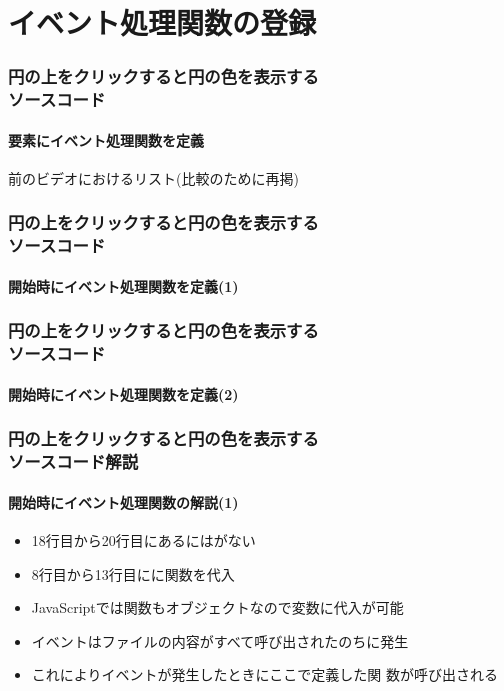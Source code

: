 \section{イベント処理関数の登録}
\begin{frame}[containsverbatim]
 \frametitle{円の上をクリックすると円の色を表示する\\ソースコード}
 \framesubtitle{要素にイベント処理関数を定義}
\centering 前のビデオにおけるリスト(比較のために再掲)
\end{frame}
\begin{frame}[containsverbatim]
 \frametitle{円の上をクリックすると円の色を表示する\\ソースコード}
  \framesubtitle{開始時にイベント処理関数を定義(1)}
\end{frame}
\begin{frame}[containsverbatim]
 \frametitle{円の上をクリックすると円の色を表示する\\ソースコード}
  \framesubtitle{開始時にイベント処理関数を定義(2)}
\end{frame}
\begin{frame}[containsverbatim]
 \frametitle{円の上をクリックすると円の色を表示する\\ソースコード解説}
  \framesubtitle{開始時にイベント処理関数の解説(1)}
 \begin{itemize}
  \item 18行目から20行目にあるにはがない
  \item 8行目から13行目にに関数を代入
  \item JavaScriptでは関数もオブジェクトなので変数に代入が可能
  \item {}イベントはファイルの内容がすべて呼び出されたのちに発生
  \item これによりイベントが発生したときにここで定義した関
        数が呼び出される
 \end{itemize}
\end{frame}
